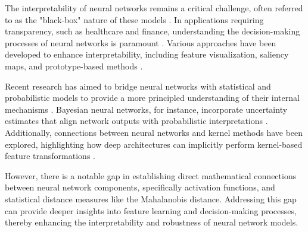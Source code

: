 The interpretability of neural networks remains a critical challenge, often referred to as the "black-box" nature of these models \citep{lipton2016mythos}. In applications requiring transparency, such as healthcare and finance, understanding the decision-making processes of neural networks is paramount \citep{rudin2019stop}. Various approaches have been developed to enhance interpretability, including feature visualization, saliency maps, and prototype-based methods \citep{erhan2009visualizing, simonyan2013deep, kim2016interpretability}.

Recent research has aimed to bridge neural networks with statistical and probabilistic models to provide a more principled understanding of their internal mechanisms \citep{bengio2013representation, goodfellow2016deep}. Bayesian neural networks, for instance, incorporate uncertainty estimates that align network outputs with probabilistic interpretations \citep{neal1996bayesian, blundell2015weight}. Additionally, connections between neural networks and kernel methods have been explored, highlighting how deep architectures can implicitly perform kernel-based feature transformations \citep{rahimi2008random}.

However, there is a notable gap in establishing direct mathematical connections between neural network components, specifically activation functions, and statistical distance measures like the Mahalanobis distance. Addressing this gap can provide deeper insights into feature learning and decision-making processes, thereby enhancing the interpretability and robustness of neural network models.
